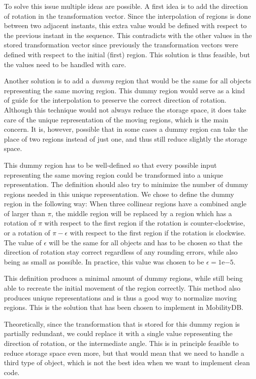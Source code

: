 To solve this issue multiple ideas are possible. A first idea is to add the direction of rotation in the transformation vector. Since the interpolation of regions is done between two adjacent instants, this extra value would be defined with respect to the previous instant in the sequence. This contradicts with the other values in the stored transformation vector since previously the transformation vectors were defined with respect to the initial (first) region. This solution is thus feasible, but the values need to be handled with care.

Another solution is to add a \textit{dummy} region that would be the same for all objects representing the same moving region. This dummy region would serve as a kind of guide for the interpolation to preserve the correct direction of rotation. Although this technique would not always reduce the storage space, it does take care of the unique representation of the moving regions, which is the main concern. It is, however, possible that in some cases a dummy region can take the place of two regions instead of just one, and thus still reduce slightly the storage space.

This dummy region has to be well-defined so that every possible input representing the same moving region could be transformed into a unique representation. The definition should also try to minimize the number of dummy regions needed in this unique representation. We chose to define the dummy region in the following way: When three collinear regions have a combined angle of larger than $\pi$, the middle region will be replaced by a region which has a rotation of $\pi$ with respect to the first region if the rotation is counter-clockwise, or a rotation of $\pi - \epsilon$ with respect to the first region if the rotation is clockwise. The value of $\epsilon$ will be the same for all objects and has to be chosen so that the direction of rotation stay correct regardless of any rounding errors, while also being as small as possible. In practice, this value was chosen to be $\epsilon = 1\mathrm{e}{-5}$.

This definition produces a minimal amount of dummy regions, while still being able to recreate the initial movement of the region correctly. This method also produces unique representations and is thus a good way to normalize moving regions. This is the solution that has been chosen to implement in MobilityDB.

Theoretically, since the transformation that is stored for this dummy region is partially redundant, we could replace it with a single value representing the direction of rotation, or the intermediate angle. This is in principle feasible to reduce storage space even more, but that would mean that we need to handle a third type of object, which is not the best idea when we want to implement clean code. 

